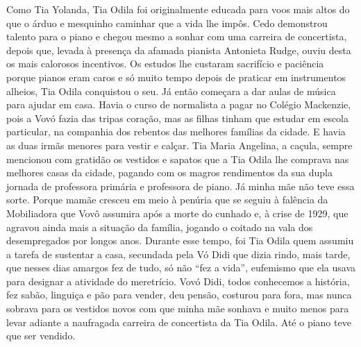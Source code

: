 Como Tia Yolanda, Tia Odila foi originalmente educada para voos mais altos do que o árduo e mesquinho caminhar que a vida lhe impôs.
Cedo demonstrou talento para o piano e chegou mesmo a sonhar com uma carreira de concertista, depois que, levada à presença da afamada pianista Antonieta Rudge, ouviu desta os mais calorosos incentivos.
Os estudos lhe custaram sacrifício e paciência porque pianos eram caros e só muito tempo depois de praticar em instrumentos alheios, Tia Odila conquistou o seu.
Já então começara a dar aulas de música para ajudar em casa.
Havia o curso de normalista a pagar no Colégio Mackenzie, pois a Vovó fazia das tripas coração, mas as filhas tinham que estudar em escola particular, na companhia dos rebentos das melhores famílias da cidade.
E havia as duas irmãs menores para vestir e calçar.
Tia Maria Angelina, a caçula, sempre mencionou com gratidão os vestidos e sapatos que a Tia Odila lhe comprava nas melhores casas da cidade, pagando com os magros rendimentos da sua dupla jornada de professora primária e professora de piano.
Já minha mãe não teve essa sorte.
Porque mamãe cresceu em meio à penúria que se seguiu à falência da Mobiliadora que Vovô assumira após a morte do cunhado e, à crise de 1929, que agravou ainda mais a situação da família, jogando o coitado na vala dos desempregados por longos anos.
Durante esse tempo, foi Tia Odila quem assumiu a tarefa de sustentar a casa, secundada pela Vó Didi que dizia rindo, mais tarde, que nesses dias amargos fez de tudo, só não ``fez a vida'', eufemismo que ela usava para designar a atividade do meretrício.
Vovó Didi, todos conhecemos a história, fez sabão, linguiça e pão para vender, deu pensão, costurou para fora, mas nunca sobrava para os vestidos novos com que minha mãe sonhava e muito menos para levar adiante a naufragada carreira de concertista da Tia Odila.
Até o piano teve que ser vendido.

